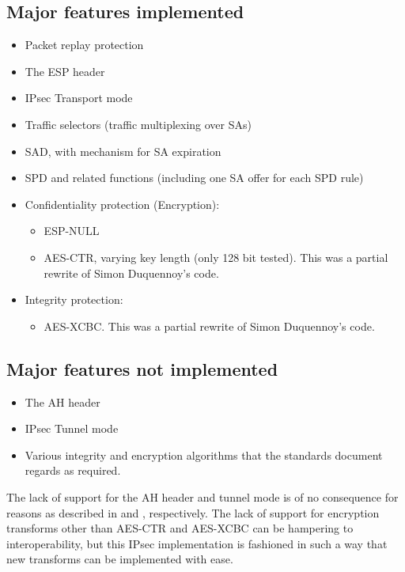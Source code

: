 \documentclass[final,a4paper,twoside,11pt,onecolumn]{report}
\begin{document}
\subsection{Major features implemented}
\begin{itemize}
   \item Packet replay protection
   \item The ESP header
   \item IPsec Transport mode
   \item Traffic selectors (traffic multiplexing over SAs)
   \item SAD, with mechanism for SA expiration
   \item SPD and related functions (including one SA offer for each SPD rule)
   \item Confidentiality protection (Encryption): 
   \begin{itemize}
      \item ESP-NULL
      \item AES-CTR, varying key length (only 128 bit tested). This was a partial rewrite of Simon Duquennoy's code.
   \end{itemize}
   \item Integrity protection:
   \begin{itemize}
           \item AES-XCBC. This was a partial rewrite of Simon Duquennoy's code.
   \end{itemize}
\end{itemize}

\subsection{Major features not implemented}
\label{sec:ipsec-features-not-imp}
\begin{itemize}
        \item The AH header
        \item IPsec Tunnel mode
        \item Various integrity and encryption algorithms that the standards document regards as required.
\end{itemize}

The lack of support for the AH header and tunnel mode is of no consequence for reasons as described in  and , respectively. The lack of support for encryption transforms other than AES-CTR and AES-XCBC can be hampering to interoperability, but this IPsec implementation is fashioned in such a way that new transforms can be implemented with ease.
\end{document}
